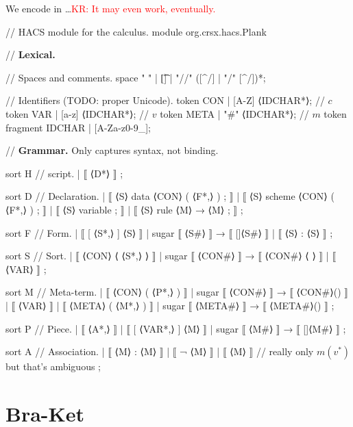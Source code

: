 \documentclass[letterpaper,11pt]{article}
\newcommand{\KR}[1]{\textcolor{red}{KR: #1}}
\begin{document}
We encode \hax in \HAX…\KR{It may even work, eventually.}
%
\begin{hacs}[numbers=right,texcl]
// HACS module for the \hax calculus.
module org.crsx.hacs.Plank {

// \textbf{Lexical.}

// Spaces and comments.
space " " | [\t\n] | "//" ([^/\n] | "/" [^/\n])*;

// Identifiers (TODO: proper Unicode).
token CON   | [A-Z] ⟨IDCHAR*⟩;   // $c$
token VAR   | [a-z] ⟨IDCHAR*⟩;    // $v$
token META  | "#" ⟨IDCHAR*⟩;     // $m$
token fragment IDCHAR | [A-Za-z0-9_];

// \textbf{Grammar.} Only captures syntax, not binding.

sort H // \hax script.
| ⟦ ⟨D*⟩ ⟧
;

sort D // Declaration.
| ⟦ ⟨S⟩ data ⟨CON⟩ ( ⟨F*,⟩ ) ; ⟧
| ⟦ ⟨S⟩ scheme ⟨CON⟩ ( ⟨F*,⟩ ) ; ⟧
| ⟦ ⟨S⟩ variable ; ⟧
| ⟦ ⟨S⟩ rule ⟨M⟩ → ⟨M⟩ ; ⟧
;

sort F // Form.
| ⟦ [ ⟨S*,⟩ ] ⟨S⟩ ⟧  | sugar ⟦ ⟨S#⟩ ⟧ → ⟦ []⟨S#⟩ ⟧
| ⟦ { ⟨S⟩ : ⟨S⟩ } ⟧
;


sort S // Sort.
| ⟦ ⟨CON⟩ ⟨ ⟨S*,⟩ ⟩ ⟧  | sugar ⟦ ⟨CON#⟩ ⟧ → ⟦ ⟨CON#⟩ ⟨ ⟩ ⟧
| ⟦ ⟨VAR⟩ ⟧
;

sort M // Meta-term.
| ⟦ ⟨CON⟩ ( ⟨P*,⟩ ) ⟧  | sugar ⟦ ⟨CON#⟩ ⟧ → ⟦ ⟨CON#⟩() ⟧
| ⟦ ⟨VAR⟩ ⟧
| ⟦ ⟨META⟩ ( ⟨M*,⟩ ) ⟧  | sugar ⟦ ⟨META#⟩ ⟧ → ⟦ ⟨META#⟩() ⟧
;

sort P // Piece.
| ⟦ { ⟨A*,⟩ } ⟧
| ⟦ [ ⟨VAR*,⟩ ] ⟨M⟩ ⟧   | sugar ⟦ ⟨M#⟩ ⟧ → ⟦ []⟨M#⟩ ⟧
;

sort A // Association.
| ⟦ ⟨M⟩ : ⟨M⟩ ⟧
| ⟦ ¬ ⟨M⟩ ⟧
| ⟦ ⟨M⟩ ⟧  // really only $m(v^*)$ but that's ambiguous
;

}
\end{hacs}


\section{Bra-Ket}
\end{document}
